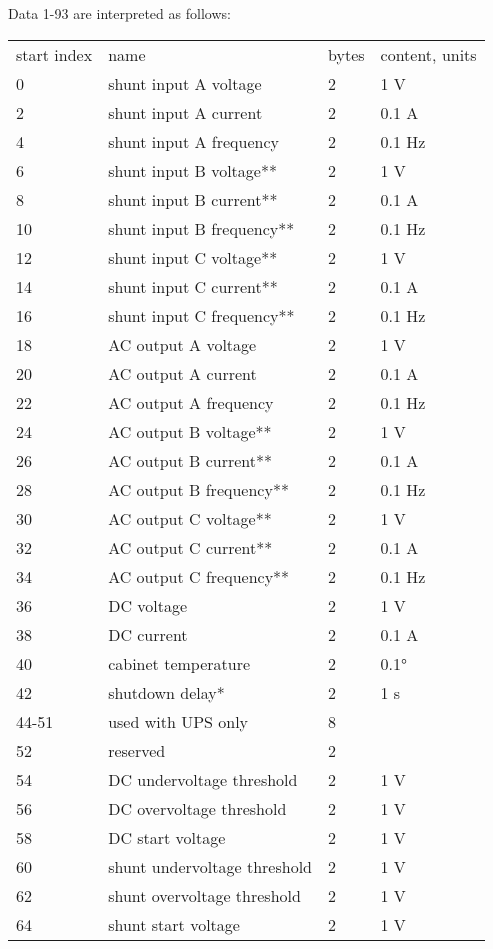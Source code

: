 \documentclass[pdftex,oneside,12pt,a4paper]{book}
\begin{document}
Data 1-93 are interpreted as follows:\\
\begin{supertabular}{llll}
start index & name & bytes & content, units \\
0 & shunt input A voltage & 2 & 1 V \\
2 & shunt input A current & 2 & 0.1 A \\
4 & shunt input A frequency & 2 & 0.1 Hz \\
6 & shunt input B voltage** & 2 & 1 V \\
8 & shunt input B current** & 2 & 0.1 A \\
10 & shunt input B frequency** & 2 & 0.1 Hz \\
12 & shunt input C voltage** & 2 & 1 V \\
14 & shunt input C current** & 2 & 0.1 A \\
16 & shunt input C frequency** & 2 & 0.1 Hz \\
18 & AC output A voltage & 2 & 1 V \\
20 & AC output A current & 2 & 0.1 A \\
22 & AC output A frequency & 2 & 0.1 Hz \\
24 & AC output B voltage** & 2 & 1 V \\
26 & AC output B current** & 2 & 0.1 A \\
28 & AC output B frequency** & 2 & 0.1 Hz \\
30 & AC output C voltage** & 2 & 1 V \\
32 & AC output C current** & 2 & 0.1 A \\
34 & AC output C frequency** & 2 & 0.1 Hz \\
36 & DC voltage & 2 & 1 V \\
38 & DC current & 2 & 0.1 A \\
40 & cabinet temperature & 2 & 0.1°  \\
42 & shutdown delay* & 2 & 1 s \\
44-51 & used with UPS only & 8 & \\
52 & reserved & 2 & \\
54 & DC undervoltage threshold & 2 & 1 V \\
56 & DC overvoltage threshold & 2 & 1 V \\
58 & DC start voltage & 2 & 1 V\\
60 & shunt undervoltage threshold & 2 & 1 V \\
62 & shunt overvoltage threshold & 2 & 1 V \\
64 & shunt start voltage & 2 & 1 V \\

\end{supertabular}
\end{document}
